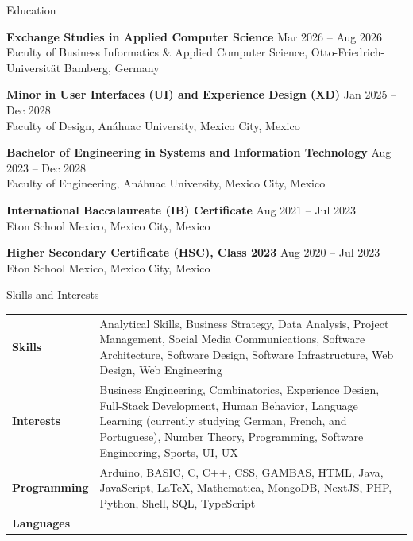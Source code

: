 \documentclass{resume} %
\begin{document}

\begin{rSection}{ Education }

{\bf{Exchange Studies in Applied Computer Science}} \hfill{Mar 2026 -- Aug 2026}
\\
Faculty of Business Informatics \& Applied Computer Science, Otto-Friedrich-Universität Bamberg, Germany

{\bf{Minor in User Interfaces (UI) and Experience Design (XD)}} \hfill{Jan 2025 -- Dec 2028}
\\
Faculty of Design, Anáhuac University, Mexico City, Mexico

{\bf{Bachelor of Engineering in Systems and Information Technology}} \hfill{Aug 2023 -- Dec 2028}
\\
Faculty of Engineering, Anáhuac University, Mexico City, Mexico

{\bf{International Baccalaureate (IB) Certificate}} \hfill{Aug 2021 -- Jul 2023}
\\
Eton School Mexico, Mexico City, Mexico

{\bf{Higher Secondary Certificate (HSC), Class 2023}} \hfill{Aug 2020 -- Jul 2023}
\\
Eton School Mexico, Mexico City, Mexico

\end{rSection}


\begin{rSection}{ Skills and Interests }

\begin{tabular}{ @{} >{\bfseries}l @{\hspace{4ex}} l }  
    Skills & Analytical Skills, Business Strategy, Data Analysis, Project Management, Social Media Communications, Software Architecture, Software Design, Software Infrastructure, Web Design, Web Engineering \\
    Interests & Business Engineering, Combinatorics, Experience Design, Full-Stack Development, Human Behavior, Language Learning (currently studying German, French, and Portuguese), Number Theory, Programming, Software Engineering, Sports, UI, UX \\
    Programming & Arduino, BASIC, C, C++, CSS, GAMBAS, HTML, Java, JavaScript, \LaTeX, Mathematica, MongoDB, NextJS, PHP, Python, Shell, SQL, TypeScript \\
    Languages &
\end{tabular}   

\end{rSection}
\end{document}
